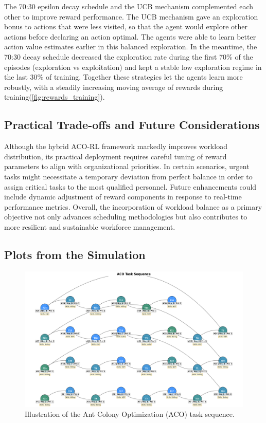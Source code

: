 \documentclass[%
aip,
cp,  %
amsmath,amssymb,
reprint,%
]{revtex4-2}
\begin{document}
	The 70:30 epsilon decay schedule and the UCB mechanism complemented each other to improve reward performance. The UCB mechanism gave an exploration bonus to actions that were less visited, so that the agent would explore other actions before declaring an action optimal. The agents were able to learn better action value estimates earlier in this balanced exploration. In the meantime, the 70:30 decay schedule decreased the exploration rate during the first 70\% of the episodes (exploration vs exploitation) and kept a stable low exploration regime in the last 30\% of training. Together these strategies let the agents learn more robustly, with a steadily increasing moving average of rewards during training(\cref{fig:rewards_training}).
	
	\subsection{\label{subsec:tradeoffs}Practical Trade-offs and Future Considerations}
	Although the hybrid ACO-RL framework markedly improves workload distribution,
	its practical deployment requires careful tuning of reward parameters to align
	with organizational priorities. In certain scenarios, urgent tasks might
	necessitate a temporary deviation from perfect balance in order to assign
	critical tasks to the most qualified personnel. Future enhancements could include
	dynamic adjustment of reward components in response to real-time performance metrics.
	Overall, the incorporation of workload balance as a primary objective not only
	advances scheduling methodologies but also contributes to more resilient and sustainable
	workforce management.
	
	
	\subsection{\label{subsec:plots}Plots from the Simulation}
	
	\begin{figure}[H]
		\centering
		\includegraphics[width=1\textwidth]{figures/aco_network.png}
		\caption{\label{fig:aco_sequence}Illustration of the Ant Colony Optimization (ACO) task sequence.}
	\end{figure}
	
\end{document}
